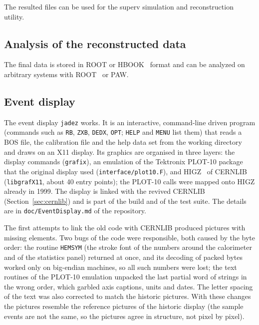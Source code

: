 The resulted files can be used for the superv simulation and reconstruction utility.
\subsection{Analysis of the reconstructed data}
The final  data  is stored in ROOT or HBOOK~\cite{Brun:1995hbook} format  and can be analyzed on arbitrary systems with ROOT~\cite{Brun:1997pa,Antcheva:2009zz} or PAW.

\subsection{Event display}
\label{sec:display}
The event display \texttt{jadez} works. It is an interactive, command-line driven program
(commands such as \texttt{RB}, \texttt{ZXB}, \texttt{DEDX}, \texttt{OPT}; \texttt{HELP} and \texttt{MENU} list them)
that reads a BOS file, the calibration file and the help data set from the working directory and draws on an
X11 display. Its graphics are organised in three layers: the display commands (\texttt{grafix}), an emulation of
the Tektronix PLOT-10 package that the original display used (\texttt{interface/\allowbreak{}plot10.F}), and HIGZ~\cite{Couet:HIGZ} of
CERNLIB (\texttt{libgrafX11}, about 40 entry points); the PLOT-10 calls were mapped onto HIGZ already in 1999.
The display is linked with the revived CERNLIB (Section~\ref{sec:cernlib}) and is part of the build and of the
test suite. The details are in \texttt{doc/\allowbreak{}EventDisplay.md} of the repository.

The first attempts to link the old code with CERNLIB produced pictures with missing elements. Two bugs of the
code were responsible, both caused by the byte order: the routine \texttt{HEMSYM} (the stroke font of the
numbers around the calorimeter and of the statistics panel) returned at once, and its decoding of packed bytes
worked only on big-endian machines, so all such numbers were lost; the text routines of the PLOT-10 emulation
unpacked the last partial word of strings in the wrong order, which garbled axis captions, units and dates. The
letter spacing of the text was also corrected to match the historic pictures. With these changes the pictures
resemble the reference pictures of the historic display (the sample events are not the same, so the pictures
agree in structure, not pixel by pixel).

